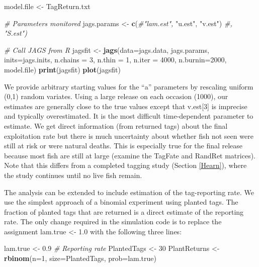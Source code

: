 \documentclass[
]{krantz}
\makeatletter
\newenvironment{Shaded}{\begin{snugshade}}{\end{snugshade}}
\newcommand{\AttributeTok}[1]{\textcolor[rgb]{0.27,0.27,0.27}{#1}}
\newcommand{\CommentTok}[1]{\textcolor[rgb]{0.37,0.37,0.37}{\textit{#1}}}
\newcommand{\DecValTok}[1]{\textcolor[rgb]{0.06,0.06,0.06}{#1}}
\newcommand{\FloatTok}[1]{\textcolor[rgb]{0.06,0.06,0.06}{#1}}
\newcommand{\FunctionTok}[1]{\textcolor[rgb]{0.27,0.27,0.27}{\textbf{#1}}}
\newcommand{\NormalTok}[1]{#1}
\newcommand{\OtherTok}[1]{\textcolor[rgb]{0.37,0.37,0.37}{#1}}
\newcommand{\StringTok}[1]{\textcolor[rgb]{0.5,0.5,0.5}{#1}}
\newenvironment{kframe}{%
\medskip{}
\setlength{\fboxsep}{.8em}
 \def\at@end@of@kframe{}%
 \ifinner\ifhmode%
  \def\at@end@of@kframe{\end{minipage}}%
  \begin{minipage}{\columnwidth}%
 \fi\fi%
 \def\FrameCommand##1{\hskip\@totalleftmargin \hskip-\fboxsep
 \colorbox{shadecolor}{##1}\hskip-\fboxsep
     \hskip-\linewidth \hskip-\@totalleftmargin \hskip\columnwidth}%
 \MakeFramed {\advance\hsize-\width
   \@totalleftmargin\z@ \linewidth\hsize
   \@setminipage}}%
 {\par\unskip\endMakeFramed%
 \at@end@of@kframe}
\renewenvironment{Shaded}{\begin{kframe}}{\end{kframe}}
\makeatother
\begin{document}
\begin{Shaded}
\begin{Highlighting}[]
\NormalTok{  model.file }\OtherTok{\textless{}{-}} \StringTok{\textquotesingle{}TagReturn.txt\textquotesingle{}}

  \CommentTok{\# Parameters monitored}
\NormalTok{  jags.params }\OtherTok{\textless{}{-}} \FunctionTok{c}\NormalTok{(}\CommentTok{\#"lam.est",}
                   \StringTok{"u.est"}\NormalTok{, }\StringTok{"v.est"}\NormalTok{)}
  \CommentTok{\#, "S.est")}

   \CommentTok{\# Call JAGS from R}
\NormalTok{  jagsfit }\OtherTok{\textless{}{-}} \FunctionTok{jags}\NormalTok{(}\AttributeTok{data=}\NormalTok{jags.data, jags.params, }\AttributeTok{inits=}\NormalTok{jags.inits,}
                  \AttributeTok{n.chains =} \DecValTok{3}\NormalTok{, }\AttributeTok{n.thin =} \DecValTok{1}\NormalTok{, }\AttributeTok{n.iter =} \DecValTok{4000}\NormalTok{, }\AttributeTok{n.burnin=}\DecValTok{2000}\NormalTok{,}
\NormalTok{                  model.file)}
  \FunctionTok{print}\NormalTok{(jagsfit)}
  \FunctionTok{plot}\NormalTok{(jagsfit)}
\end{Highlighting}
\end{Shaded}

We provide arbitrary starting values for the ``a'' parameters by rescaling uniform (0,1) random variates. Using a large release on each occasion (1000), our estimates are generally close to the true values except that v.est{[}3{]} is imprecise and typically overestimated. It is the most difficult time-dependent parameter to estimate. We get direct information (from returned tags) about the final exploitation rate but there is much uncertainty about whether fish not seen were still at risk or were natural deaths. This is especially true for the final release because most fish are still at large (examine the TagFate and RandRet matrices). Note that this differs from a completed tagging study (Section \ref{Hearn}), where the study continues until no live fish remain.

The analysis can be extended to include estimation of the tag-reporting rate. We use the simplest approach of a binomial experiment using planted tags. The fraction of planted tags that are returned is a direct estimate of the reporting rate. The only change required in the simulation code is to replace the assignment lam.true \textless- 1.0 with the following three lines:

\begin{Shaded}
\begin{Highlighting}[]
\NormalTok{lam.true }\OtherTok{\textless{}{-}} \FloatTok{0.9}  \CommentTok{\# Reporting rate}
\NormalTok{PlantedTags }\OtherTok{\textless{}{-}} \DecValTok{30}
\NormalTok{PlantReturns }\OtherTok{\textless{}{-}} \FunctionTok{rbinom}\NormalTok{(}\AttributeTok{n=}\DecValTok{1}\NormalTok{, }\AttributeTok{size=}\NormalTok{PlantedTags, }\AttributeTok{prob=}\NormalTok{lam.true)}
\end{Highlighting}
\end{Shaded}
\end{document}
